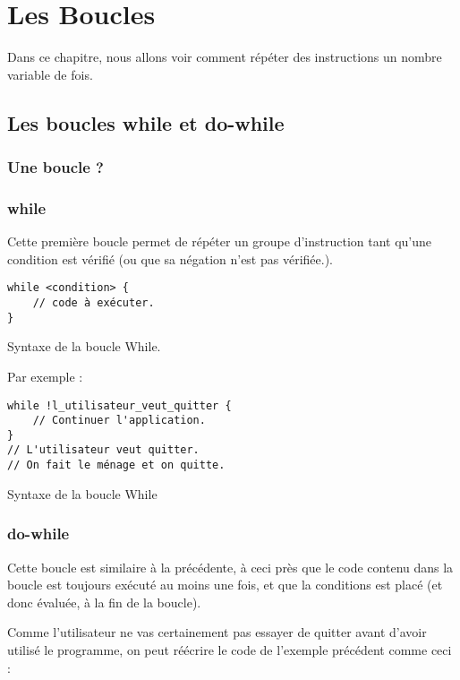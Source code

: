 \chapter{Les Boucles}
Dans ce chapitre, nous allons voir comment
répéter des instructions un nombre variable de fois.
\section{Les boucles while et do-while}
\subsection{Une boucle ?}

\subsection{while}
Cette première boucle permet de répéter un groupe d'instruction tant qu'une condition est vérifié (ou que sa négation n'est pas vérifiée.).

\begin{listing}[h]
\begin{verbatim}
while <condition> {
    // code à exécuter.
}
\end{verbatim}
\caption{Syntaxe de la boucle While.}
\end{listing}

Par exemple :
\begin{listing}[h]
\begin{verbatim}
while !l_utilisateur_veut_quitter {
    // Continuer l'application.
}
// L'utilisateur veut quitter.
// On fait le ménage et on quitte.
\end{verbatim}
\caption{Syntaxe de la boucle While}
\end{listing}
\subsection{do-while}
Cette boucle est similaire à la précédente, à ceci près que le code contenu dans la boucle est toujours exécuté au moins une fois, et que la conditions est placé (et donc évaluée, à la fin de la boucle).

Comme l'utilisateur ne vas certainement pas essayer de quitter avant d'avoir utilisé le programme, on peut réécrire le code de l'exemple précédent comme ceci :
\begin{listing}[h]
\begin{verbatim}
// Initialisation du programme
do {
    // La boucle principale,
    // exécutée tant que l'utilisateur ne veut pas quitter.
} while !l_utilisateur_veut_quitter
// L'utilisateur veut quitter.
// On fait le ménage et on quitte.
\end{verbatim}Avec une boucle Do While}
\end{listing}

